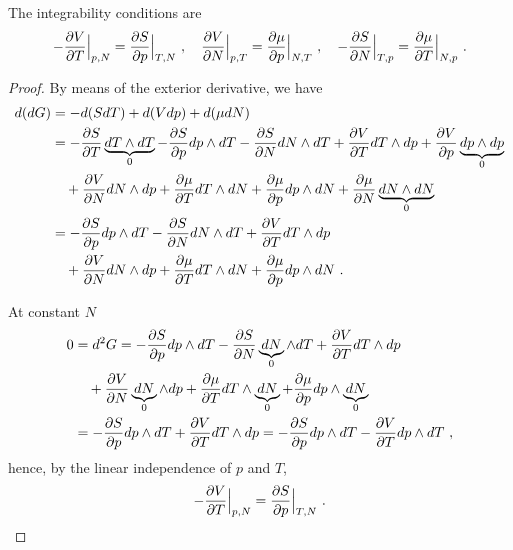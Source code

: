     The integrability conditions are 
    \begin{equation}\label{intcondgib}
        - \frac{\partial V}{\partial T} \Big \vert_{p,N} = \frac{\partial S}{\partial p} \Big \vert_{T,N} ~, \quad 
        \frac{\partial V}{\partial N} \Big \vert_{p,T} = \frac{\partial\mu}{\partial p} \Big \vert_{N, T} ~, \quad 
        - \frac{\partial S}{\partial N} \Big \vert_{T,p} = \frac{\partial\mu}{\partial T} \Big \vert_{N, p} ~. 
    \end{equation}
    \begin{proof}
        By means of the exterior derivative, we have 
        \begin{equation*}
        \begin{aligned}
            d (dG) & = - d (S dT) + d (V dp) + d (\mu dN) \\ & = - \frac{\partial S}{\partial T} \underbrace{dT \wedge dT}_0 - \frac{\partial S}{\partial p} dp \wedge dT - \frac{\partial S}{\partial N} dN \wedge dT + \frac{\partial V}{\partial T} dT \wedge dp + \frac{\partial V}{\partial p} \underbrace{dp \wedge dp}_0 \\ & \quad + \frac{\partial V}{\partial N} dN \wedge dp + \frac{\partial\mu}{\partial T} dT \wedge dN + \frac{\partial\mu}{\partial p} dp \wedge dN + \frac{\partial\mu}{\partial N} \underbrace{dN \wedge dN}_0 \\ & = - \frac{\partial S}{\partial p} dp \wedge dT - \frac{\partial S}{\partial N} dN \wedge dT + \frac{\partial V}{\partial T} dT \wedge dp \\ & \quad + \frac{\partial V}{\partial N} dN \wedge dp + \frac{\partial\mu}{\partial T} dT \wedge dN + \frac{\partial\mu}{\partial p} dp \wedge dN ~.
        \end{aligned}
        \end{equation*}

        At constant $N$ 
        \begin{equation*}
        \begin{aligned}
            0 & = d^2 G = - \frac{\partial S}{\partial p} dp \wedge dT - \frac{\partial S}{\partial N} \underbrace{dN}_0 \wedge dT + \frac{\partial V}{\partial T} dT \wedge dp \\ & \quad + \frac{\partial V}{\partial N} \underbrace{dN}_0 \wedge dp + \frac{\partial\mu}{\partial T} dT \wedge \underbrace{dN}_0 + \frac{\partial\mu}{\partial p} dp \wedge \underbrace{dN}_0 \\ & = - \frac{\partial S}{\partial p} dp \wedge dT + \frac{\partial V}{\partial T} dT \wedge dp = - \frac{\partial S}{\partial p} dp \wedge dT - \frac{\partial V}{\partial T} dp \wedge dT ~,
        \end{aligned}
        \end{equation*}
        hence, by the linear independence of $p$ and $T$,
        \begin{equation*}
            - \frac{\partial V}{\partial T} \Big \vert_{p,N} = \frac{\partial S}{\partial p} \Big \vert_{T,N} ~.
        \end{equation*}


\end{proof}
